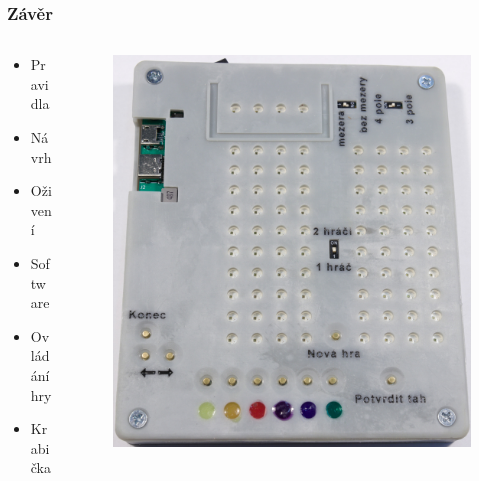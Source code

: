 \documentclass[%
  12pt,       				%
	t,                  %
	aspectratio=1610,   %
	unicode,						%
]{beamer}				    	%
\begin{document}
\begin{frame} 
	\frametitle{Závěr}
	\begin{columns}[T] %
		\begin{column}{0.3\textwidth}		%
			\vspace{0.5cm}
			\begin{itemize}
				\item Pravidla
				\item Návrh
				\item Oživení
				\item Software
				\item Ovládání hry
				\item Krabička
			\end{itemize}
		\end{column}
		\begin{column}{0.7\textwidth}		%
			\begin{figure}%
				\centering
				\includegraphics[width=0.65\columnwidth]{obrazky/Kompletace.jpg}
			\end{figure}
		\end{column}
	\end{columns}	
\end{frame}
\end{document}

